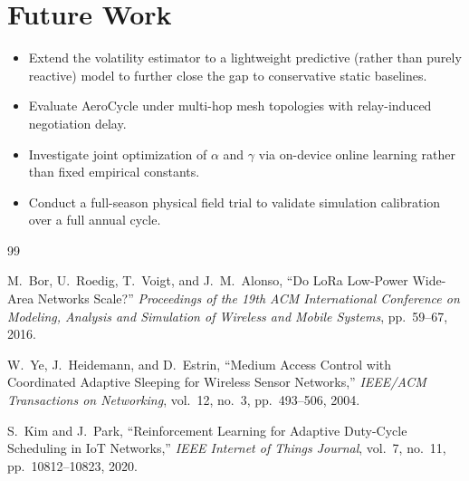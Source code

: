 \section{Future Work}
\begin{itemize}[leftmargin=1.4em]
  \item Extend the volatility estimator to a lightweight predictive (rather than purely
        reactive) model to further close the gap to conservative static baselines.
  \item Evaluate AeroCycle under multi-hop mesh topologies with relay-induced negotiation
        delay.
  \item Investigate joint optimization of $\alpha$ and $\gamma$ via on-device online
        learning rather than fixed empirical constants.
  \item Conduct a full-season physical field trial to validate simulation calibration over
        a full annual cycle.
\end{itemize}

\begin{thebibliography}{99}

M.~Bor, U.~Roedig, T.~Voigt, and J.~M.~Alonso,
``Do LoRa Low-Power Wide-Area Networks Scale?''
\emph{Proceedings of the 19th ACM International Conference on Modeling, Analysis and
Simulation of Wireless and Mobile Systems}, pp.~59--67, 2016.

W.~Ye, J.~Heidemann, and D.~Estrin,
``Medium Access Control with Coordinated Adaptive Sleeping for Wireless Sensor Networks,''
\emph{IEEE/ACM Transactions on Networking}, vol.~12, no.~3, pp.~493--506, 2004.

S.~Kim and J.~Park,
``Reinforcement Learning for Adaptive Duty-Cycle Scheduling in IoT Networks,''
\emph{IEEE Internet of Things Journal}, vol.~7, no.~11, pp.~10812--10823, 2020.

\end{thebibliography}

\appendix
